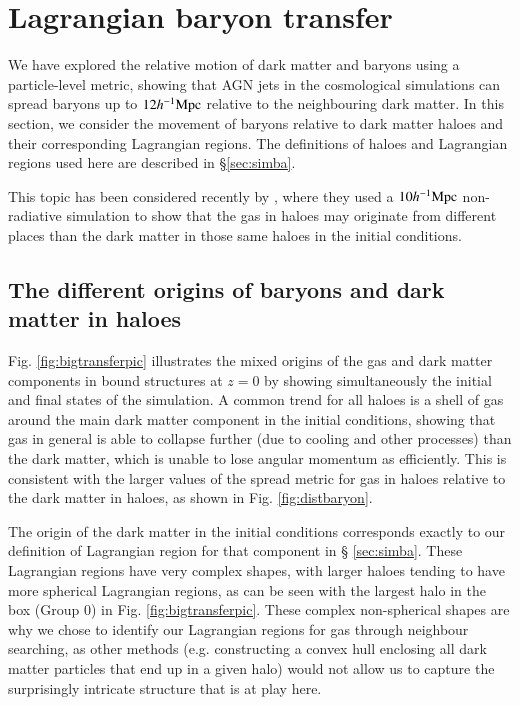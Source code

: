 \section{Lagrangian baryon transfer}
\label{sec:transfer}

We have explored the relative motion of dark matter and baryons using a
particle-level metric, showing that AGN jets in the \simba{} cosmological
simulations can spread baryons up to $12h^{-1}{\rm Mpc}{}$ relative to the neighbouring
dark matter. In this section, we consider the movement of baryons relative to
dark matter haloes and their corresponding Lagrangian regions. The definitions of
haloes and Lagrangian regions used here are described in \S \ref{sec:simba}.

This topic has been considered recently by \citet{Liao2017}, where they used
a $10h^{-1}{\rm Mpc}{}$ non-radiative simulation to show that the gas in haloes may
originate from different places than the dark matter in those same haloes in
the initial conditions.

\subsection{The different origins of baryons and dark matter in haloes}

Fig. \ref{fig:bigtransferpic} illustrates the mixed origins of the gas and
dark matter components in bound structures at $z=0$ by showing simultaneously
the initial and final states of the simulation. A common trend for all haloes
is a shell of gas around the main dark matter component in the initial
conditions, showing that gas in general is able to collapse further (due to
cooling and other processes) than the dark matter, which is unable to lose
angular momentum as efficiently. This is consistent with the larger values of
the spread metric for gas in haloes relative to the dark matter in haloes, as
shown in Fig. \ref{fig:distbaryon}.

The origin of the dark matter in the initial conditions corresponds exactly
to our definition of Lagrangian region for that component in \S
\ref{sec:simba}. These Lagrangian regions have very complex shapes, with
larger haloes tending to have more spherical Lagrangian regions, as can be
seen with the largest halo in the box (Group 0) in Fig.
\ref{fig:bigtransferpic}. These complex non-spherical shapes are why we
chose to identify our Lagrangian regions for gas through neighbour searching,
as other methods (e.g. constructing a convex hull enclosing all dark matter
particles that end up in a given halo) would not allow us to capture the
surprisingly intricate structure that is at play here.

